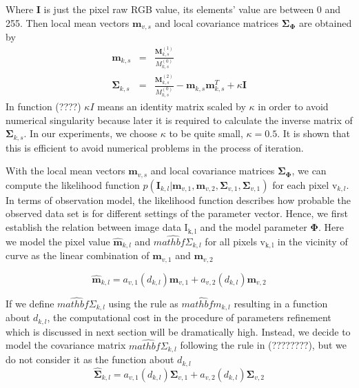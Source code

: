 Where $\mathbf{I}$ is just the pixel raw RGB value, its elements'
value are between 0 and 255. Then local mean vectors $\mathbf{m}_{v,s}$  and local covariance matrices
$\mathbf{\Sigma}_{\mathbf{\Phi}}$  are obtained by 
\begin{eqnarray}
  \label{eq:5.14}
  \mathbf{m}_{k,s} &=& \frac{\mathbf{M}^{(1)}_{k,s}}{M^{(0)}_{k,s}}\\
  \mathbf{\Sigma}_{k,s} &=& \frac{\mathbf{M}^{(2)}_{k,s}}{M^{(0)}_{k,s}}
  - \mathbf{m}_{k,s}\mathbf{m}_{k,s}^T  + \kappa \mathbf{I}
\end{eqnarray}
In function (????) $\kappa I$  means an identity matrix scaled by
$\kappa$ in order to avoid numerical singularity because later it is
required to calculate the inverse matrix of
$\mathbf{\Sigma}_{k,s}$. In our experiments, we choose $\kappa$ to be
quite small, $\kappa = 0.5$. It is shown that this is efficient to
avoid numerical problems in the process of iteration.

With the local mean vectors $\mathbf{m}_{v,s}$  and local covariance matrices
$\mathbf{\Sigma}_{\mathbf{\Phi}}$, we can compute the
likelihood function   $p(\mathbf{I}_{k,l} | \mathbf{m}_{v,1}, \mathbf{m}_{v,2},
  \mathbf{\Sigma}_{v,1}, \mathbf{\Sigma}_{v,1})$ for each pixel
  $\mathrm{v}_{k,l}$. In terms of observation model, the likelihood
  function describes how probable the observed data set is for
  different settings of the parameter vector. Hence, we first establish
  the relation between image data $\mathrm{I_{k,l}}$ and the model
  parameter $\mathbf{\Phi}$. Here we model the pixel value
  $\hat{\mathbf{m}}_{k,l}$ and $\hat{mathbf{\Sigma}}_{k,l}$
  for all pixels $\mathrm{v_{k,l}}$ in the vicinity of curve as the
  linear combination of $\mathbf{m}_{v,1}$ and $\mathbf{m}_{v,2}$

  \begin{equation}
    \label{eq:5.17}
    \hat{\mathbf{m}}_{k,l} = a_{v,1}(d_{k,l})\mathbf{m}_{v,1} + a_{v,2}(d_{k,l})\mathbf{m}_{v,2}
  \end{equation}

If we define  $\hat{mathbf{\Sigma}}_{k,l}$ using the rule as
$\hat{mathbf{m}}_{k,l}$ resulting in a function about $d_{k,l}$, the computational cost in the procedure of
parameters refinement which is discussed in next section  will be dramatically high. Instead, we decide to
model the covariance matrix $\hat{mathbf{\Sigma}}_{k,l}$ following the
rule in (????????), but we do not consider it as the function about $d_{k,l}$
\begin{equation}
  \label{eq:5.18}
  \hat{\mathbf{\mathbf{\Sigma}}}_{k,l} = a_{v,1}(d_{k,l})\mathbf{\Sigma}_{v,1} + a_{v,2}(d_{k,l})\mathbf{\Sigma}_{v,2}
\end{equation}

